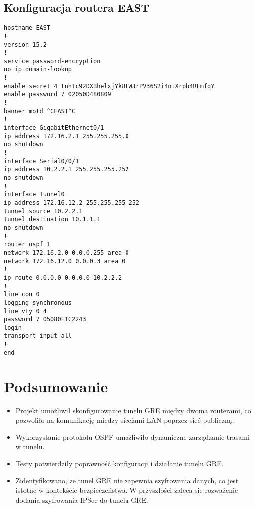\documentclass[12pt,twoside,a4paper,openany]{article}
\begin{document}
\subsection*{Konfiguracja routera EAST}
\begin{lstlisting}[caption={Konfiguracja routera EAST}, label={lst:east-config}]
hostname EAST
!
version 15.2
!
service password-encryption
no ip domain-lookup
!
enable secret 4 tnhtc92DXBhelxjYk8LWJrPV36S2i4ntXrpb4RFmfqY
enable password 7 02050D480809
!
banner motd ^CEAST^C
!
interface GigabitEthernet0/1
ip address 172.16.2.1 255.255.255.0
no shutdown
!
interface Serial0/0/1
ip address 10.2.2.1 255.255.255.252
no shutdown
!
interface Tunnel0
ip address 172.16.12.2 255.255.255.252
tunnel source 10.2.2.1
tunnel destination 10.1.1.1
no shutdown
!
router ospf 1
network 172.16.2.0 0.0.0.255 area 0
network 172.16.12.0 0.0.0.3 area 0
!
ip route 0.0.0.0 0.0.0.0 10.2.2.2
!
line con 0
logging synchronous
line vty 0 4
password 7 05080F1C2243
login
transport input all
!
end
\end{lstlisting}

\section{Podsumowanie}
\begin{itemize}
    \item Projekt umożliwił skonfigurowanie tunelu GRE między dwoma routerami, co pozwoliło na komunikację między sieciami LAN poprzez sieć publiczną.
    \item Wykorzystanie protokołu OSPF umożliwiło dynamiczne zarządzanie trasami w tunelu.
    \item Testy potwierdziły poprawność konfiguracji i działanie tunelu GRE.
    \item Zidentyfikowano, że tunel GRE nie zapewnia szyfrowania danych, co jest istotne w kontekście bezpieczeństwa. W przyszłości zaleca się rozważenie dodania szyfrowania IPSec do tunelu GRE.
\end{itemize}

\newpage
\printbibliography[heading=bibnumbered, label=Literatura, title=Literatura]

\newpage
\hypersetup{linkcolor=black}
\renewcommand{\cftparskip}{3pt}
\clearpage
\renewcommand{\cftloftitlefont}{\Large\bfseries\sffamily}



\todos
\end{document}
